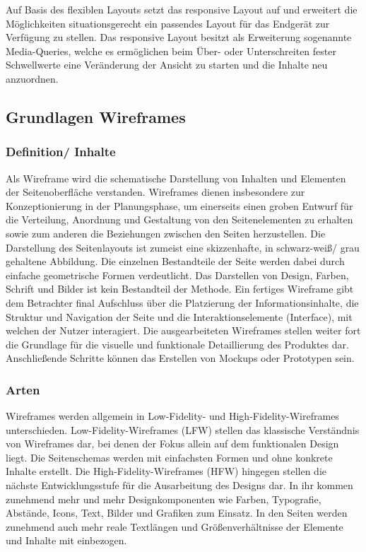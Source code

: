 Auf Basis des flexiblen Layouts setzt das responsive Layout auf und erweitert die Möglichkeiten situationsgerecht ein passendes Layout für das Endgerät zur Verfügung zu stellen. Das responsive Layout besitzt als Erweiterung sogenannte Media-Queries, welche es ermöglichen beim Über- oder Unterschreiten fester Schwellwerte eine Veränderung der Ansicht zu starten und die Inhalte \bspw neu anzuordnen.

\subsection{Grundlagen Wireframes}

\subsubsection{Definition/ Inhalte}

Als Wireframe wird die schematische Darstellung von Inhalten und Elementen der Seitenoberfläche verstanden. Wireframes dienen insbesondere zur Konzeptionierung in der Planungsphase, um einerseits einen groben Entwurf für die Verteilung, Anordnung und Gestaltung von den Seitenelementen zu erhalten sowie zum anderen die Beziehungen zwischen den Seiten herzustellen.
Die Darstellung des Seitenlayouts ist zumeist eine skizzenhafte, in schwarz-weiß/ grau gehaltene Abbildung. Die einzelnen Bestandteile der Seite werden dabei durch einfache geometrische Formen verdeutlicht. Das Darstellen von Design, Farben, Schrift und Bilder ist kein Bestandteil der Methode. Ein fertiges Wireframe gibt dem Betrachter final Aufschluss über die Platzierung der Informationsinhalte, die Struktur und Navigation der Seite und die Interaktionselemente (Interface), mit welchen der Nutzer interagiert.
Die ausgearbeiteten Wireframes stellen weiter fort die Grundlage für die visuelle und funktionale Detaillierung des Produktes dar. Anschließende Schritte können \ua das Erstellen von Mockups oder Prototypen sein.

\subsubsection{Arten}

Wireframes werden allgemein in Low-Fidelity- und High-Fidelity-Wireframes unterschieden.
Low-Fidelity-Wireframes (LFW) stellen das klassische Verständnis von Wireframes dar, bei denen der Fokus allein auf dem funktionalen Design liegt. Die Seitenschemas werden mit einfachsten Formen und ohne konkrete Inhalte erstellt.
Die High-Fidelity-Wireframes (HFW) hingegen stellen die nächste Entwicklungsstufe für die Ausarbeitung des Designs dar. In ihr kommen zunehmend mehr und mehr Designkomponenten wie Farben, Typografie, Abstände, Icons, Text, Bilder und Grafiken zum Einsatz. In den Seiten werden zunehmend auch mehr reale Textlängen und Größenverhältnisse der Elemente und Inhalte mit einbezogen.

